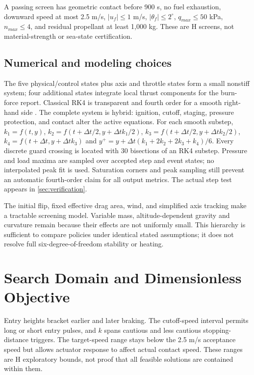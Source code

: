 \documentclass[11pt,a4paper]{article}
\begin{document}
A passing screen has geometric contact before 900 s, no fuel exhaustion, downward speed at most 2.5 m/s, $|u_f|\le1$ m/s, $|\theta_f|\le2^\circ$, $q_{max}\le50$ kPa, $n_{max}\le4$, and residual propellant at least 1,000 kg. These are H screens, not material-strength or sea-state certification.

\subsection{Numerical and modeling choices}
The five physical/control states plus axis and throttle states form a small nonstiff system; four additional states integrate local thrust components for the burn-force report. Classical RK4 is transparent and fourth order for a smooth right-hand side \cite{hairer}. The complete system is hybrid: ignition, cutoff, staging, pressure protection, and contact alter the active equations. For each smooth substep, $k_1=f(t,y)$, $k_2=f(t+\Delta t/2,y+\Delta t k_1/2)$, $k_3=f(t+\Delta t/2,y+\Delta t k_2/2)$, $k_4=f(t+\Delta t,y+\Delta t k_3)$ and $y^+=y+\Delta t(k_1+2k_2+2k_3+k_4)/6$. Every discrete guard crossing is located with 30 bisections of an RK4 substep. Pressure and load maxima are sampled over accepted step and event states; no interpolated peak fit is used. Saturation corners and peak sampling still prevent an automatic fourth-order claim for all output metrics. The actual step test appears in \cref{sec:verification}.

The initial flip, fixed effective drag area, wind, and simplified axis tracking make a tractable screening model. Variable mass, altitude-dependent gravity and curvature remain because their effects are not uniformly small. This hierarchy is sufficient to compare policies under identical stated assumptions; it does not resolve full six-degree-of-freedom stability or heating.

\section{Search Domain and Dimensionless Objective}

Entry heights bracket earlier and later braking. The cutoff-speed interval permits long or short entry pulses, and $k$ spans cautious and less cautious stopping-distance triggers. The target-speed range stays below the 2.5 m/s acceptance speed but allows actuator response to affect actual contact speed. These ranges are H exploratory bounds, not proof that all feasible solutions are contained within them.
\end{document}
